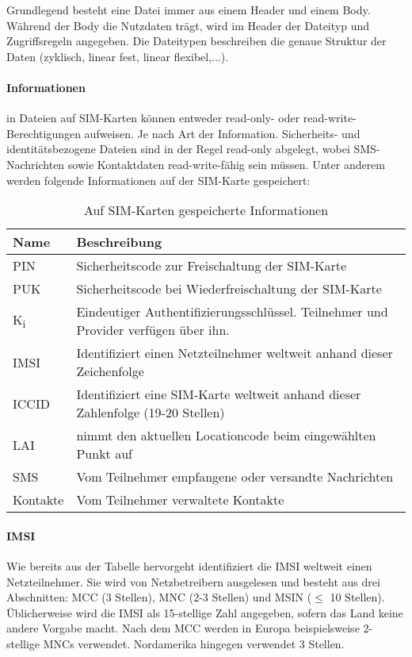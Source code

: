 Grundlegend besteht eine Datei immer aus einem Header und einem Body. Während
der Body die Nutzdaten trägt, wird im Header der Dateityp und Zugriffsregeln
angegeben. Die Dateitypen beschreiben die genaue Struktur der Daten (zyklisch, linear fest,
linear flexibel,...).

\paragraph{Informationen} in Dateien auf SIM-Karten können entweder read-only- oder read-write-
Berechtigungen aufweisen. Je nach Art der Information. Sicherheits- und identitätsbezogene
Dateien sind in der Regel read-only abgelegt, wobei SMS-Nachrichten sowie Kontaktdaten
read-write-fähig sein müssen. Unter anderem werden folgende Informationen auf der SIM-Karte gespeichert:

\begin{table}[h]
    \begin{tabularx}{\textwidth}{|l|X|}
    \hline
      \textbf{Name} & \textbf{Beschreibung} \\
    \hline
    \hline
      \ac{PIN} & Sicherheitscode zur Freischaltung der SIM-Karte \\
    \hline
    \hline
          \ac{PUK} & Sicherheitscode bei Wiederfreischaltung der SIM-Karte \\
    \hline
    \hline
      K\textsubscript{i} & Eindeutiger Authentifizierungsschlüssel. Teilnehmer und Provider verfügen über ihn. \\
    \hline
    \hline
      \ac{IMSI} & Identifiziert einen Netzteilnehmer weltweit anhand dieser Zeichenfolge \\
    \hline
    \hline
      \ac{ICCID} & Identifiziert eine SIM-Karte weltweit anhand dieser Zahlenfolge (19-20 Stellen) \\
    \hline
    \hline
      \ac{LAI} & nimmt den aktuellen Locationcode beim eingewählten Punkt auf \\ 
    \hline
    \hline
      SMS & Vom Teilnehmer empfangene oder versandte Nachrichten \\
    \hline
    \hline
      Kontakte & Vom Teilnehmer verwaltete Kontakte \\
    \hline
    \end{tabularx}
    \caption{Auf SIM-Karten gespeicherte Informationen}
  \end{table}

\paragraph{IMSI} Wie bereits aus der Tabelle hervorgeht identifiziert die \ac{IMSI} weltweit
einen Netzteilnehmer. Sie wird von Netzbetreibern ausgelesen und besteht aus drei Abschnitten:
\ac{MCC} (3 Stellen), \ac{MNC} (2-3 Stellen) und \ac{MSIN} ($\leq$ 10 Stellen).
Üblicherweise wird die \ac{IMSI} als 15-stellige Zahl angegeben, sofern das
Land keine andere Vorgabe macht. Nach dem \ac{MCC} werden in Europa beispielsweise 2-stellige \acp{MNC}
verwendet. Nordamerika hingegen verwendet 3 Stellen. 

